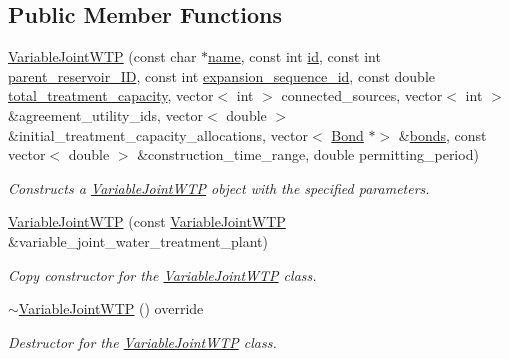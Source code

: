 \subsection*{Public Member Functions}
\begin{DoxyCompactItemize}
\item 
\mbox{\hyperlink{classVariableJointWTP_a26fa2204e90fb7e44f17dbd2958a56fc}{Variable\+Joint\+W\+TP}} (const char $\ast$\mbox{\hyperlink{classWaterSource_a846ea74c5b453d014f594d41fee8c765}{name}}, const int \mbox{\hyperlink{classWaterSource_a6eafe5dfefd317877d1244e8a7c6e742}{id}}, const int \mbox{\hyperlink{classJointWTP_aa5830cb4d3013a004b7168f4dbf475eb}{parent\+\_\+reservoir\+\_\+\+ID}}, const int \mbox{\hyperlink{classJointWTP_a0e10a7f7ade04d5f3572f185de1b8653}{expansion\+\_\+sequence\+\_\+id}}, const double \mbox{\hyperlink{classWaterSource_a2fdfd5ff7d103e71108cf2a31babaccb}{total\+\_\+treatment\+\_\+capacity}}, vector$<$ int $>$ connected\+\_\+sources, vector$<$ int $>$ \&agreement\+\_\+utility\+\_\+ids, vector$<$ double $>$ \&initial\+\_\+treatment\+\_\+capacity\+\_\+allocations, vector$<$ \mbox{\hyperlink{classBond}{Bond}} $\ast$$>$ \&\mbox{\hyperlink{classWaterSource_a413b094e11bdce62f4d82e5bb9e4706e}{bonds}}, const vector$<$ double $>$ \&construction\+\_\+time\+\_\+range, double permitting\+\_\+period)
\begin{DoxyCompactList}\small\item\em Constructs a {\ttfamily \mbox{\hyperlink{classVariableJointWTP}{Variable\+Joint\+W\+TP}}} object with the specified parameters. \end{DoxyCompactList}\item 
\mbox{\hyperlink{classVariableJointWTP_afb1491d02ab8f69966b5dda871dadb34}{Variable\+Joint\+W\+TP}} (const \mbox{\hyperlink{classVariableJointWTP}{Variable\+Joint\+W\+TP}} \&variable\+\_\+joint\+\_\+water\+\_\+treatment\+\_\+plant)
\begin{DoxyCompactList}\small\item\em Copy constructor for the {\ttfamily \mbox{\hyperlink{classVariableJointWTP}{Variable\+Joint\+W\+TP}}} class. \end{DoxyCompactList}\item 
\mbox{\hyperlink{classVariableJointWTP_aaa9eccc2b254ebe82769cc90bed5b893}{$\sim$\+Variable\+Joint\+W\+TP}} () override
\begin{DoxyCompactList}\small\item\em Destructor for the {\ttfamily \mbox{\hyperlink{classVariableJointWTP}{Variable\+Joint\+W\+TP}}} class. \end{DoxyCompactList}\item 
$$
\end{DoxyCompactItemize}
